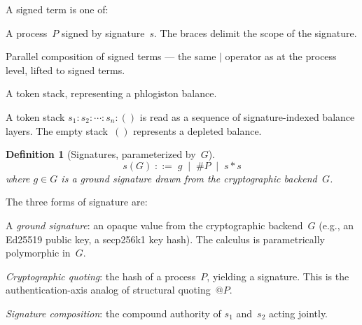 \documentclass[11pt,a4paper]{article}
\makeatletter
\newtheorem{definition}[theorem]{Definition}
\newcommand{\Par}{\mathbin{|}}
\newcommand{\quot}[1]{@#1}
\newcommand{\signed}[2]{\{#1\}_{#2}}
\newcommand{\comp}{\mathbin{*}}
\newcommand{\hashf}{\texttt{\#}}
\makeatother
\begin{document}
\noindent
A signed term is one of:
\begin{description}[style=nextline, leftmargin=2em]
  \item[$\signed{P}{s}$]
    A process~$P$ signed by signature~$s$.  The braces
    delimit the scope of the signature.
  \item[$T \Par U$]
    Parallel composition of signed terms --- the same
    $\Par$ operator as at the process level, lifted to
    signed terms.
  \item[$S$]
    A token stack, representing a phlogiston balance.
\end{description}

\noindent
A token stack $s_1 : s_2 : \cdots : s_n : ()$ is read as a
sequence of signature-indexed balance layers.  The empty
stack~$()$ represents a depleted balance.

\begin{definition}[Signatures, parameterized by~$G$]
  \label{def:sig}
  \begin{equation}
    s(G) \;::=\; g
          \;\mid\; \hashf P
          \;\mid\; s \comp s
    \label{eq:sig-syntax}
  \end{equation}
  where $g \in G$ is a \emph{ground signature} drawn from the
  cryptographic backend~$G$.
\end{definition}

\noindent
The three forms of signature are:
\begin{description}[style=nextline, leftmargin=2em]
  \item[$g$]
    A \emph{ground signature}: an opaque value from the
    cryptographic backend~$G$ (e.g., an Ed25519 public key, a
    secp256k1 key hash).  The calculus is parametrically
    polymorphic in~$G$.
  \item[$\hashf P$]
    \emph{Cryptographic quoting}: the hash of a process~$P$,
    yielding a signature.  This is the authentication-axis
    analog of structural quoting~$\quot{P}$.
  \item[$s_1 \comp s_2$]
    \emph{Signature composition}: the compound authority of
    $s_1$ and~$s_2$ acting jointly.
\end{description}
\end{document}

